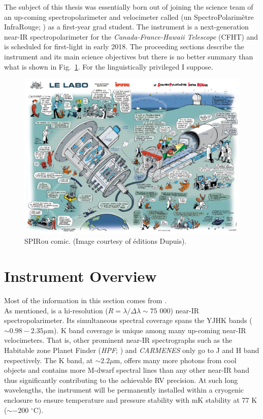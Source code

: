 The subject of this thesis was essentially born out of joining the science team of 
an up-coming spectropolarimeter and velocimeter 
called \spirou{} (un SpectroPolarim\`{e}tre 
InfraRouge; \cite{thibault12, artigau14}) as a first-year grad student. 
The instrument is a next-generation near-IR 
spectropolarimeter for the \emph{Canada-France-Hawaii Telescope} (CFHT) and is 
scheduled for first-light in early 2018. The proceeding sections describe the 
instrument and its main science objectives but there is no better summary than what 
is shown in Fig.~\ref{fig:spiroucomic}. For the linguistically privileged I suppose. 

\begin{figure}
\centering
\includegraphics[scale=.4]{figures/SPIROU1-300.jpg}
\caption{SPIRou comic. (Image courtesy of \'{e}ditions Dupuis).
\label{fig:spiroucomic}}
\end{figure}

\section{Instrument Overview} \label{sect:instrument}
Most of the information in this section comes from \cite{donati14a}. \\

As mentioned, \spirou{} is a hi-resolution ($R=\lambda / \Delta \lambda \sim 75$ 
000) near-IR spectropolarimeter. Its simultaneous 
spectral coverage spans the YJHK bands ($\sim 0.98-2.35 \mu$m). K band coverage is 
unique among many up-coming near-IR velocimeters. That is, other prominent 
near-IR spectrographs such as the Habitable zone Planet Finder (\emph{HPF}; 
\cite{halverson14}) and \emph{CARMENES} \parencite{quirrenbach14} 
only go to J and H band respectively. The K band, at $\sim 2.2 \mu$m, offers 
many more photons from cool objects and contains more M-dwarf spectral lines 
than any other near-IR band 
thus significantly contributing to the achievable RV 
precision. At such long wavelengths, the instrument will be permanently installed 
within a cryogenic enclosure to ensure temperature and pressure stability 
with mK stability at 77 K ($\sim -200$ $^{\circ}$C). \\

